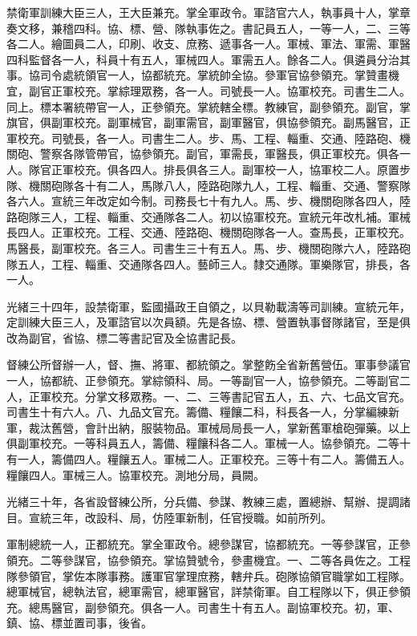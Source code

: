 \begin{pinyinscope}
禁衛軍訓練大臣三人，王大臣兼充。掌全軍政令。軍諮官六人，執事員十人，掌章奏文移，兼稽四科。協、標、營、隊執事佐之。書記員五人，一等一人，二、三等各二人。繪圖員二人，印刷、收支、庶務、遞事各一人。軍械、軍法、軍需、軍醫四科監督各一人，科員十有五人，軍械四人。軍需五人。餘各二人。俱遴員分治其事。協司令處統領官一人，協都統充。掌統帥全協。參軍官協參領充。掌贊畫機宜，副官正軍校充。掌綜理眾務，各一人。司號長一人。協軍校充。司書生二人。同上。標本署統帶官一人，正參領充。掌統轄全標。教練官，副參領充。副官，掌旗官，俱副軍校充。副軍械官，副軍需官，副軍醫官，俱協參領充。副馬醫官，正軍校充。司號長，各一人。司書生二人。步、馬、工程、輜重、交通、陸路砲、機關砲、警察各隊管帶官，協參領充。副官，軍需長，軍醫長，俱正軍校充。俱各一人。隊官正軍校充。俱各四人。排長俱各三人。副軍校一人，協軍校二人。原置步隊、機關砲隊各十有二人，馬隊八人，陸路砲隊九人，工程、輜重、交通、警察隊各六人。宣統三年改定如今制。司務長七十有九人。馬、步、機關砲隊各四人，陸路砲隊三人，工程、輜重、交通隊各二人。初以協軍校充。宣統元年改札補。軍械長四人。正軍校充。工程、交通、陸路砲、機關砲隊各一人。查馬長，正軍校充。馬醫長，副軍校充。各三人。司書生三十有五人。馬、步、機關砲隊六人，陸路砲隊五人，工程、輜重、交通隊各四人。藝師三人。隸交通隊。軍樂隊官，排長，各一人。

光緒三十四年，設禁衛軍，監國攝政王自領之，以貝勒載濤等司訓練。宣統元年，定訓練大臣三人，及軍諮官以次員額。先是各協、標、營置執事督隊諸官，至是俱改為副官，省協、標二等書記官及全協書記長。

督練公所督辦一人，督、撫、將軍、都統領之。掌整飭全省新舊營伍。軍事參議官一人，協都統、正參領充。掌綜領科、局。一等副官一人，協參領充。二等副官二人，正軍校充。分掌文移眾務。一、二、三等書記官五人，五、六、七品文官充。司書生十有六人。八、九品文官充。籌備、糧饟二科，科長各一人，分掌編練新軍，裁汰舊營，會計出納，服裝物品。軍械局局長一人，掌新舊軍槍砲彈藥。以上俱副軍校充。一等科員五人，籌備、糧饟科各二人。軍械一人。協參領充。二等十有一人，籌備四人。糧饟五人。軍械二人。正軍校充。三等十有二人。籌備五人。糧饟四人。軍械三人。協軍校充。測地分局，員闕。

光緒三十年，各省設督練公所，分兵備、參謀、教練三處，置總辦、幫辦、提調諸目。宣統三年，改設科、局，仿陸軍新制，任官授職。如前所列。

軍制總統一人，正都統充。掌全軍政令。總參謀官，協都統充。一等參謀官，正參領充。二等參謀官，協參領充。掌協贊號令，參畫機宜。一、二等各員佐之。工程隊參領官，掌佐本隊事務。護軍官掌理庶務，轄弁兵。砲隊協領官職掌如工程隊。總軍械官，總執法官，總軍需官，總軍醫官，詳禁衛軍。自工程隊以下，俱正參領充。總馬醫官，副參領充。俱各一人。司書生十有五人。副協軍校充。初，軍、鎮、協、標並置司事，後省。


\end{pinyinscope}
